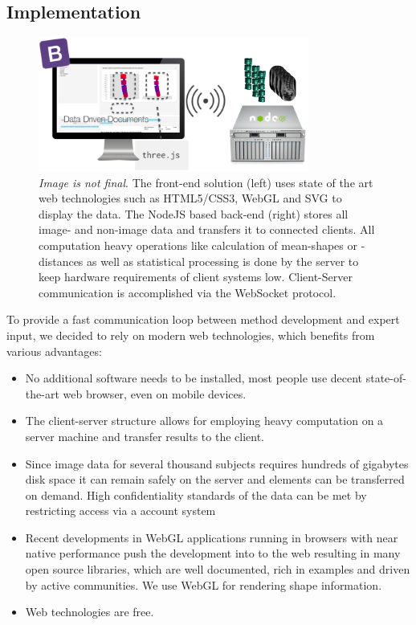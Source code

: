 \documentclass[journal]{style/vgtc} 			          %
\begin{document}
\subsection{Implementation}
\begin{figure}[htb]
 \centering
 \label{fig:technologies}
 \includegraphics[width=3.5in]{figures/technologies}
 \caption{\emph{Image is not final}. The front-end solution (left) uses state of the art web technologies such as HTML5/CSS3, WebGL and SVG to display the data.
 The NodeJS based back-end (right) stores all image- and non-image data and transfers it to connected clients.
 All computation heavy operations like calculation of mean-shapes or -distances as well as statistical processing is done by the server to keep hardware requirements of client systems low. 
 Client-Server communication is accomplished via the WebSocket protocol.
 }
\end{figure}
%
To provide a fast communication loop between method development and expert input, we decided to rely on modern web technologies, which benefits from various advantages:
\begin{itemize}
	\item No additional software needs to be installed, most people use decent state-of-the-art web browser, even on mobile devices.
	\item The client-server structure allows for employing heavy computation on a server machine and transfer results to the client.
	\item Since image data for several thousand subjects requires hundreds of gigabytes disk space it can remain safely on the server and elements can be transferred on demand.
	High confidentiality standards of the data can be met by restricting access via a account system
	\item Recent developments in WebGL applications running in browsers with near native performance push the development into to the web resulting in many open source libraries, which are well documented, rich in examples and driven by active communities. We use WebGL for rendering shape information.
	\item Web technologies are free.
\end{itemize}
\end{document}
